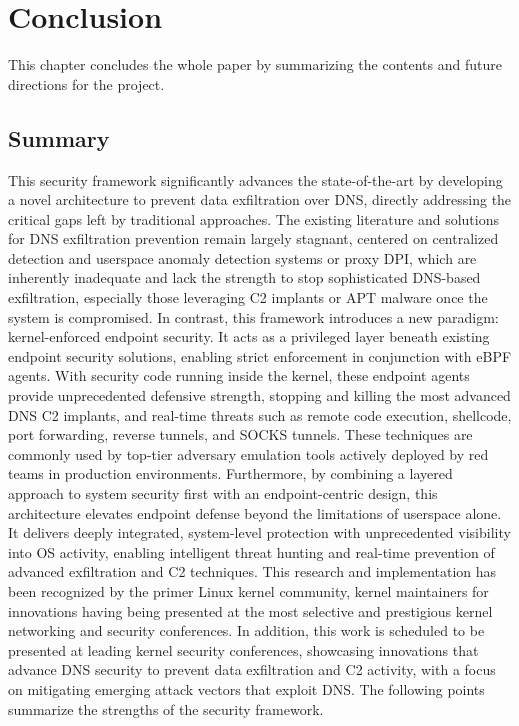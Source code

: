 \documentclass [11pt, proquest] {uwthesis}[2020/02/24]
\begin{document}


    

\chapter{Conclusion}
This chapter concludes the whole paper by summarizing the contents and  future directions for the project.


\section{Summary}
This security framework significantly advances the state-of-the-art by developing a novel architecture to prevent data exfiltration over DNS, directly addressing the critical gaps left by traditional approaches. The existing literature and solutions for DNS exfiltration prevention remain largely stagnant, centered on centralized detection and userspace anomaly detection systems or proxy DPI, which are inherently inadequate and lack the strength to stop sophisticated DNS-based exfiltration, especially those leveraging C2 implants or APT malware once the system is compromised. In contrast, this framework introduces a new paradigm: kernel-enforced endpoint security. It acts as a privileged layer beneath existing endpoint security solutions, enabling strict enforcement in conjunction with eBPF agents. With security code running inside the kernel, these endpoint agents provide unprecedented defensive strength, stopping and killing the most advanced DNS C2 implants, and real-time threats such as remote code execution, shellcode, port forwarding, reverse tunnels, and SOCKS tunnels. These techniques are commonly used by top-tier adversary emulation tools actively deployed by red teams in production environments.
Furthermore, by combining a layered approach to system security first with an endpoint-centric design, this architecture elevates endpoint defense beyond the limitations of userspace alone. It delivers deeply integrated, system-level protection with unprecedented visibility into OS activity, enabling intelligent threat hunting and real-time prevention of advanced exfiltration and C2 techniques. This research and implementation has been recognized by the primer Linux kernel community, kernel maintainers for innovations having being presented at the most selective and prestigious kernel networking and security conferences. In addition, this work is scheduled to be presented at leading kernel security conferences, showcasing innovations that advance DNS security to prevent data exfiltration and C2 activity, with a focus on mitigating emerging attack vectors that exploit DNS. The following points summarize the strengths of the security framework.
\end{document}
